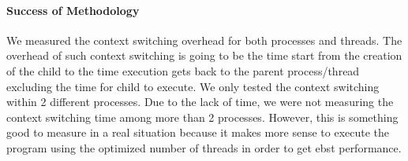 \paragraph{Success of Methodology}
We measured the context switching overhead for both processes and threads. The overhead of such context switching is going to be the time start from the creation of the child to the time execution gets back to the parent process/thread excluding the time for child to execute. We only tested the context switching within 2 different processes. Due to the lack of time, we were not measuring the context switching time among more than 2 processes. However, this is something good to measure in a real situation because it makes more sense to execute the program using the optimized number of threads in order to get ebst performance.



